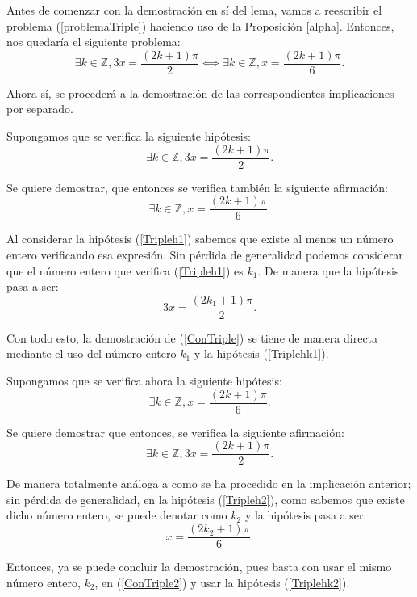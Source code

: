 \begin{demostracion}
  Antes de comenzar con la demostración en sí del lema, vamos a
  reescribir el problema (\ref{problemaTriple}) haciendo uso de la
  Proposición \ref{alpha}. Entonces, nos quedaría el siguiente problema:
  \begin{equation}
    ∃ k ∈ ℤ, 3x = \frac{(2k+1)π}{2} ⟺ ∃ k ∈ ℤ, x = \frac{(2k+1)π}{6}.
  \end{equation}

  Ahora sí, se procederá a la demostración de las correspondientes
  implicaciones por separado.

  \noindent
  \framebox{\longrightarrow}
  Supongamos que se verifica la siguiente hipótesis:
  \begin{equation}\label{Tripleh1}\tag{h1}
    ∃ k ∈ ℤ, 3x = \frac{(2k+1)π}{2}.
  \end{equation}

  Se quiere demostrar, que entonces se verifica también la siguiente
  afirmación:
  \begin{equation}\label{ConTriple}
     ∃k ∈ ℤ, x = \frac{(2k+1)π}{6}.
   \end{equation}

   Al considerar la hipótesis (\ref{Tripleh1}) sabemos que existe al
   menos un número entero verificando esa expresión. Sin pérdida de
   generalidad podemos considerar que el número entero que verifica
   (\ref{Tripleh1}) es \(k_1\). De manera que la hipótesis pasa a ser:
   \begin{equation}\label{Triplehk1}\tag{hk1}
    3x = \frac{(2k_1+1)π}{2}.
  \end{equation}

  Con todo esto, la demostración de (\ref{ConTriple}) se tiene de manera
  directa mediante el uso del número entero \(k_1\) y la hipótesis
  (\ref{Triplehk1}).

   \noindent
   \framebox{\longleftarrow}
   Supongamos que se verifica ahora la siguiente hipótesis:
   \begin{equation}\label{Tripleh2}\tag{h2}
     ∃ k ∈ ℤ, x = \frac{(2k+1)π}{6}.
  \end{equation}

  Se quiere demostrar que entonces, se verifica la siguiente afirmación:
  \begin{equation}\label{ConTriple2}
    ∃ k ∈ ℤ, 3x = \frac{(2k+1)π}{2}.
  \end{equation}

  De manera totalmente análoga a como se ha procedido en la implicación
  anterior; sin pérdida de generalidad, en la hipótesis
  (\ref{Tripleh2}), como sabemos que existe dicho número entero, se
  puede denotar como \(k_2\) y la hipótesis pasa a ser:
  \begin{equation}\label{Triplehk2}\tag{hk2}
     x = \frac{(2k_2+1)π}{6}.
   \end{equation}

   Entonces, ya se puede concluir la demostración, pues basta con usar
   el mismo número entero, \(k_2\), en (\ref{ConTriple2}) y usar la
   hipótesis (\ref{Triplehk2}).
\end{demostracion}

